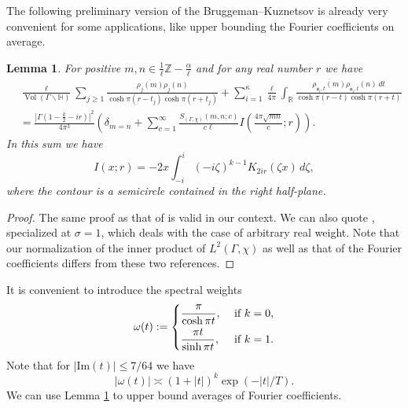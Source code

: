 \documentclass{article}
\newtheorem{lem}[thm]{Lemma}
\theoremstyle{named}
\newcommand{\Z}{\mathbb{Z}}
\newcommand{\Hyp}{\mathbb{H}}
\newcommand{\R}{\mathbb{R}}
\renewcommand{\a}{\mathfrak{a}}
\DeclareMathOperator{\vol}{Vol}
\begin{document}
The following preliminary version of the Bruggeman--Kuznetsov is already very convenient for some applications, like upper bounding the Fourier coefficients on average.
\begin{lem}\label{lem:preliminarykuznetsov}
For positive $m,n \in \frac{1}{\ell}\Z - \frac{\alpha}{\ell}$ and for any real number $r$ we have 
\begin{equation}\label{eq:prekuznetsov}
\begin{aligned}
    & \frac{\ell}{\vol(\Gamma\backslash \Hyp)}\sum_{j \geq 1} \frac{\overline{\rho_j(m)} \rho_j(n)}{\cosh \pi (r - t_j) \cosh \pi (r + t_j)} + \sum_{i = 1}^{\kappa}\frac{\ell}{4\pi}\int_\R \frac{\overline{\rho_{\a_i, t}(m)}\rho_{\a_i, t}(n)\, dt}{\cosh \pi (r - t)\cosh \pi (r + t)}\\
    & = \frac{|\Gamma\left(1 - \frac{k}{2} - ir\right)|^2}{4\pi^3}\left(\delta_{m =  n}+ \sum_{c = 1}^\infty \frac{S_{(\Gamma, \chi)}(m, n; c)}{c \ell }I\left(\frac{4\pi \sqrt{mn}}{c}; r\right)\right).
\end{aligned}
\end{equation}
In this sum we have
\begin{equation*}
    I(x; r) = -2x \int_{-i}^{i}(-i\zeta)^{k-1}K_{2ir}(\zeta x)\, d\zeta,
\end{equation*}
where the contour is a semicircle contained in the right half-plane. 
\end{lem}
\begin{proof}
The same proof as that of \cite[Proposition 5.2]{DFIsubconvexityartin} is valid in our context. We can also quote \cite[Lemma 3]{proskurinarbitraryweightkuznetsov}, specialized at $\sigma = 1$, which deals with the case of arbitrary real weight. Note that our normalization of the inner product of $L^2(\Gamma, \chi)$ as well as that of the Fourier coefficients differs from these two references.
\end{proof}

It is convenient to introduce the spectral weights
\begin{equation}\label{eq:weightskuznetsov}
    \omega(t) := \begin{dcases}
        \frac{\pi}{\cosh \pi t}, & \text{ if }k = 0,\\
        \frac{\pi t}{\sinh \pi t}, & \text{ if }k = 1.
    \end{dcases}
\end{equation}
Note that for $|\text{Im}(t)| \leq 7/64$ we have
\begin{equation*}
    |\omega(t)| \asymp (1 + |t|)^k \exp(-|t|/T).
\end{equation*}
We can use Lemma \ref{lem:preliminarykuznetsov} to upper bound averages of Fourier coefficients.
\end{document}
